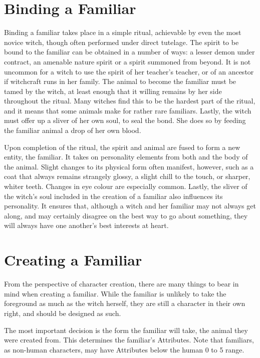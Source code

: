 \section{Binding a Familiar}

Binding a familiar takes place in a simple ritual, achievable by even the most novice witch, though often performed under direct tutelage.
The spirit to be bound to the familiar can be obtained in a number of ways: a lesser demon under contract, an amenable nature spirit or a spirit summoned from beyond.
It is not uncommon for a witch to use the spirit of her teacher's teacher, or of an ancestor if witchcraft runs in her family.
The animal to become the familiar must be tamed by the witch, at least enough that it willing remains by her side throughout the ritual.
Many witches find this to be the hardest part of the ritual, and it means that some animals make for rather rare familiars.
Lastly, the witch must offer up a sliver of her own soul, to seal the bond.
She does so by feeding the familiar animal a drop of her own blood.

Upon completion of the ritual, the spirit and animal are fused to form a new entity, the familiar.
It takes on personality elements from both and the body of the animal.
Slight changes to its physical form often manifest, however, such as a coat that always remains strangely glossy, a slight chill to the touch, or sharper, whiter teeth.
Changes in eye colour are especially common.
Lastly, the sliver of the witch's soul included in the creation of a familiar also influences its personality.
It ensures that, although a witch and her familiar may not always get along, and may certainly disagree on the best way to go about something, they will always have one another's best interests at heart.

\section{Creating a Familiar}

From the perspective of character creation, there are many things to bear in mind when creating a familiar.
While the familiar is unlikely to take the foreground as much as the witch herself, they are still a character in their own right, and should be designed as such.

The most important decision is the form the familiar will take, the animal they were created from.
This determines the familiar's Attributes.
Note that familiars, as non-human characters, may have Attributes below the human 0 to 5 range.

